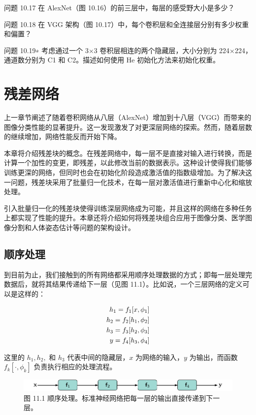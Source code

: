 \documentclass[lang=cn,newtx,10pt,scheme=chinese]{elegantbook}
\begin{document}
问题 10.17 在 AlexNet（图 10.16）的前三层中，每层的感受野大小是多少？

问题 10.18 在 VGG 架构（图 10.17）中，每个卷积层和全连接层分别有多少权重和偏置？

问题 10.19∗ 考虑通过一个 3×3 卷积层相连的两个隐藏层，大小分别为 224×224，通道数分别为 C1 和 C2。描述如何使用 He 初始化方法来初始化权重。

\chapter{残差网络}

上一章节阐述了随着卷积网络从八层（AlexNet）增加到十八层（VGG）而带来的图像分类性能的显著提升。这一发现激发了对更深层网络的探索。然而，随着层数的继续增加，网络性能反而开始下降。

本章将介绍残差块的概念。在残差网络中，每一层不是直接对输入进行转换，而是计算一个加性的变更，即残差，以此修改当前的数据表示。这种设计使得我们能够训练更深的网络，但同时也会在初始化阶段造成激活值的指数级增加。为了解决这一问题，残差块采用了批量归一化技术，在每一层对激活值进行重新中心化和缩放处理。

引入批量归一化的残差块使得训练深层网络成为可能，并且这样的网络在多种任务上都实现了性能的提升。本章还将介绍如何将残差块组合应用于图像分类、医学图像分割和人体姿态估计等问题的架构设计。
\section{顺序处理}
到目前为止，我们接触到的所有网络都采用顺序处理数据的方式；即每一层处理完数据后，就将其结果传递给下一层（见图 11.1）。比如说，一个三层网络的定义可以是这样的：


\begin{align}
h_1 = f_1[x, \phi_1] \notag \\
h_2 = f_2[h_1, \phi_2] \notag \\
h_3 = f_3[h_2, \phi_3] \notag \\
y = f_4[h_3, \phi_4] 
\end{align} 


这里的 \(h_1, h_2,\) 和 \(h_3\) 代表中间的隐藏层，\(x\) 为网络的输入，\(y\) 为输出，而函数 \(f_k[\cdot, \phi_k]\) 负责执行相应的处理流程。

\begin{figure}[ht!]
\centering
\includegraphics[width=0.7\linewidth]{PDFFigures/UDLChap11PDF/ResidualSequential.pdf}
\caption{图 11.1 顺序处理。标准神经网络把每一层的输出直接传递到下一层。}
\end{figure}
\end{document}
